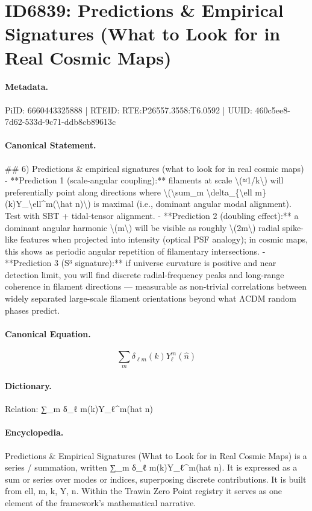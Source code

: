 \section*{ID6839: Predictions \& Empirical Signatures (What to Look for in Real Cosmic Maps)}
\paragraph{Metadata.}
PiID: 6660443325888 | RTEID: RTE:P26557.3558:T6.0592 | UUID: 460c5ee8-7d62-533d-9c71-ddb8cb89613c

\paragraph{Canonical Statement.}
\#\# 6) Predictions \& empirical signatures (what to look for in real cosmic maps) - **Prediction 1 (scale-angular coupling):** filaments at scale \textbackslash{}(≈1/k\textbackslash{}) will preferentially point along directions where \textbackslash{}(\textbackslash{}sum\_m \textbackslash{}delta\_\{\textbackslash{}ell m\}(k)Y\_\textbackslash{}ell\textasciicircum{}m(\textbackslash{}hat n)\textbackslash{}) is maximal (i.e., dominant angular modal alignment). Test with SBT + tidal-tensor alignment. - **Prediction 2 (doubling effect):** a dominant angular harmonic \textbackslash{}(m\textbackslash{}) will be visible as roughly \textbackslash{}(2m\textbackslash{}) radial spike-like features when projected into intensity (optical PSF analogy); in cosmic maps, this shows as periodic angular repetition of filamentary intersections. - **Prediction 3 (S³ signature):** if universe curvature is positive and near detection limit, you will find discrete radial-frequency peaks and long-range coherence in filament directions — measurable as non-trivial correlations between widely separated large-scale filament orientations beyond what ΛCDM random phases predict.

\paragraph{Canonical Equation.}
\[
\sum_m \delta_{\ell m}(k)Y_\ell^m(\hat n)
\]

\paragraph{Dictionary.}
Relation: ∑\_m δ\_ℓ m(k)Y\_ℓ\textasciicircum{}m(hat n)

\paragraph{Encyclopedia.}
Predictions \& Empirical Signatures (What to Look for in Real Cosmic Maps) is a series / summation, written ∑\_m δ\_ℓ m(k)Y\_ℓ\textasciicircum{}m(hat n). It is expressed as a sum or series over modes or indices, superposing discrete contributions. It is built from ell, m, k, Y, n. Within the Trawin Zero Point registry it serves as one element of the framework's mathematical narrative.
